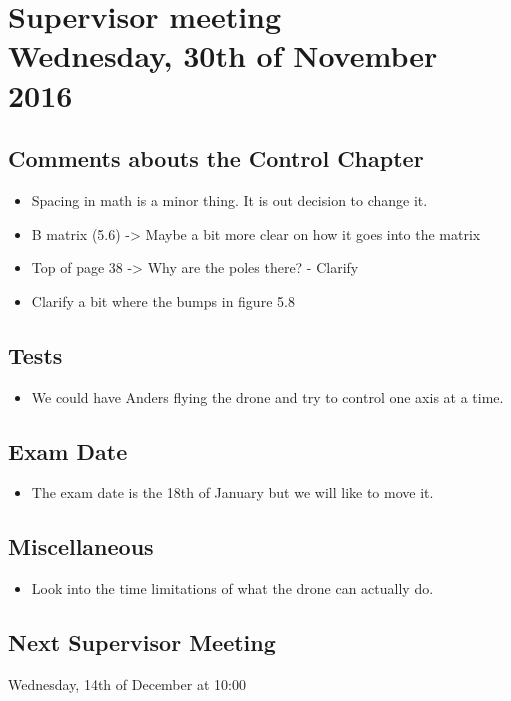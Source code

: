 
\renewcommand{\vec}[1]{\boldsymbol{\mathbf{#1}}}

\renewcommand\chaptername{KAPITEL}
\renewcommand\contentsname{Indhold}
\renewcommand\figurename{Figur}
\renewcommand\tablename{Tabel}

\section*{Supervisor meeting\\ \small Wednesday, 30th of November 2016}
\subsection{Comments abouts the Control Chapter}
\begin{itemize}
	\item Spacing in math is a minor thing. It is out decision to change it.
	\item B matrix (5.6) -> Maybe a bit more clear on how it goes into the matrix
	\item Top of page 38 -> Why are the poles there? - Clarify
	\item Clarify a bit where the bumps in figure 5.8
\end{itemize}	
\subsection{Tests}
\begin{itemize}
	\item We could have Anders flying the drone and try to control one axis at a time.
\end{itemize}
\subsection{Exam Date}
\begin{itemize}
	\item The exam date is the 18th of January but we will like to move it.
\end{itemize}
\subsection{Miscellaneous}
\begin{itemize}
	\item Look into the time limitations of what the drone can actually do.
\end{itemize}
\subsection{Next Supervisor Meeting}
Wednesday, 14th of December at 10:00

